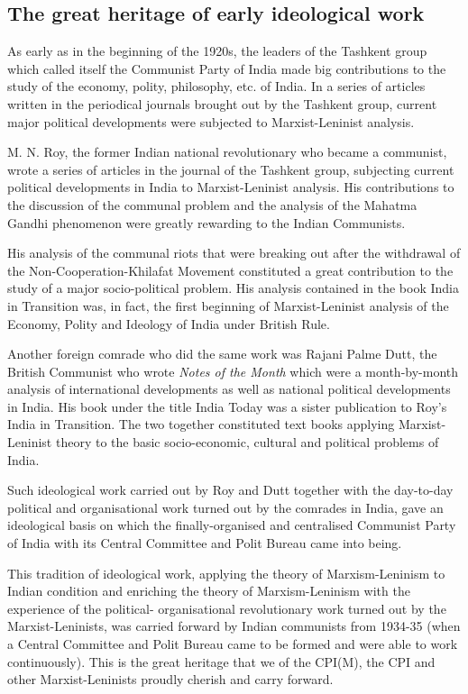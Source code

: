 \subsection{The great heritage of early ideological work}

As early as in the beginning of the 1920s, the leaders of the Tashkent group which called itself the Communist Party of India made big contributions to the study of the economy, polity, philosophy, etc. of India. In a series of articles written in the periodical journals brought out by the Tashkent group, current major political developments were subjected to Marxist-Leninist analysis. 

M. N. Roy, the former Indian national revolutionary who became a communist, wrote a series of articles in the journal of the Tashkent group, subjecting current political developments in India to Marxist-Leninist analysis. His contributions to the discussion of the communal problem and the analysis of the Mahatma Gandhi phenomenon were greatly rewarding 
to the Indian Communists. 

His analysis of the communal riots that were breaking out after the withdrawal of the Non-Cooperation-Khilafat Movement constituted a great contribution to the study of a major socio-political problem. His analysis contained in the book India in Transition was, in fact, the first beginning of Marxist-Leninist analysis of the Economy, Polity and Ideology of India under British Rule. 

Another foreign comrade who did the same work was Rajani Palme Dutt, the British Communist who wrote \textit{Notes of the Month} which were a month-by-month analysis of international developments as well as national political developments in India. His book under the title India Today was a sister publication to Roy’s India in Transition. The two together constituted text books applying Marxist-Leninist theory to the basic socio-economic, cultural and political problems of India. 

Such ideological work carried out by Roy and Dutt together with the day-to-day political and organisational work turned out by the comrades in India, gave an ideological basis on which 
the finally-organised and centralised Communist Party of India with its Central Committee and Polit Bureau came into being. 

This tradition of ideological work, applying the theory of Marxism-Leninism to Indian condition and enriching the theory of Marxism-Leninism with the experience of the political- 
organisational revolutionary work turned out by the Marxist-Leninists, was carried forward by Indian communists from 1934-35 (when a Central Committee and Polit Bureau came to be formed and were able to work continuously). This is the great heritage that we of the CPI(M), the CPI and other Marxist-Leninists proudly cherish and carry forward. 

